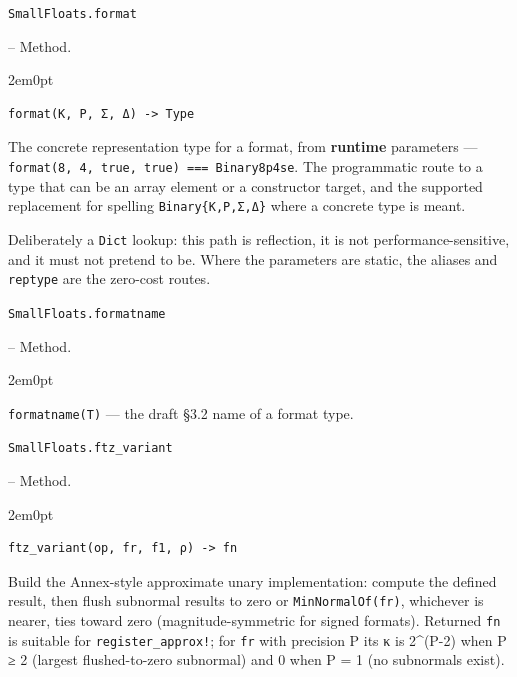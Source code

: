 \par\medskip\noindent\begin{minipage}{\linewidth}
\hypertarget{3988641001870183445}{\texttt{SmallFloats.format}}  -- {Method.}
\nopagebreak
\begin{adjustwidth}{2em}{0pt}


\begin{verbatim}
format(K, P, Σ, Δ) -> Type
\end{verbatim}

The concrete representation type for a format, from \textbf{runtime} parameters — \texttt{format(\allowbreak{}8, 4, true, true) === Binary8p4se}. The programmatic route to a type that can be an array element or a constructor target, and the supported replacement for spelling \texttt{Binary\{K,P,Σ,Δ\}} where a concrete type is meant.

Deliberately a \texttt{Dict} lookup: this path is reflection, it is not performance-sensitive, and it must not pretend to be. Where the parameters are static, the aliases and \texttt{reptype} are the zero-cost routes.



\end{adjustwidth}
\end{minipage}
\par\medskip

\par\medskip\noindent\begin{minipage}{\linewidth}
\hypertarget{10160445188737908012}{\texttt{SmallFloats.formatname}}  -- {Method.}
\nopagebreak
\begin{adjustwidth}{2em}{0pt}

\texttt{formatname(T)} — the draft §3.2 name of a format type.



\end{adjustwidth}
\end{minipage}
\par\medskip

\par\medskip\noindent\begin{minipage}{\linewidth}
\hypertarget{14294533040464309059}{\texttt{SmallFloats.ftz\_\allowbreak{}variant}}  -- {Method.}
\nopagebreak
\begin{adjustwidth}{2em}{0pt}


\begin{verbatim}
ftz_variant(op, fr, f1, ρ) -> fn
\end{verbatim}

Build the Annex-style approximate unary implementation: compute the defined result, then flush subnormal results to zero or \texttt{MinNormalOf(fr)}, whichever is nearer, ties toward zero (magnitude-symmetric for signed formats). Returned \texttt{fn} is suitable for \texttt{register\_\allowbreak{}approx!}; for \texttt{fr} with precision P its κ is 2{\textasciicircum}(P-2) when P ≥ 2 (largest flushed-to-zero subnormal) and 0 when P = 1 (no subnormals exist).



\end{adjustwidth}
\end{minipage}
\par\medskip

